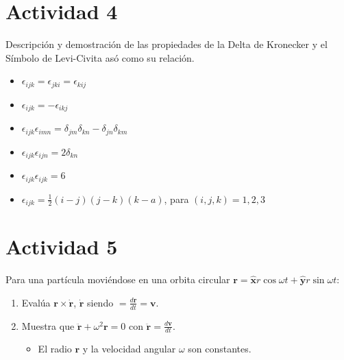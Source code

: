 \documentclass{article}
\begin{document}
\section{Actividad 4}
Descripción y demostración de las propiedades de la Delta de Kronecker y el Símbolo de Levi-Civita asó como su relación.
\begin{itemize}
    \item $\epsilon_{ijk}=\epsilon_{jki}=\epsilon_{kij}$
    \item $\epsilon_{ijk}=-\epsilon_{ikj}$
    \item $\epsilon_{ijk}\epsilon_{imn}=\delta_{jm}\delta_{kn}-\delta_{jn}\delta_{km}$
    \item $\epsilon_{ijk}\epsilon_{ijn}=2\delta_{kn}$
    \item $\epsilon_{ijk}\epsilon_{ijk}=6$
    \item $\epsilon_{ijk}=\frac{1}{2}(i-j)(j-k)(k-a)$, para $(i,j,k)=1,2,3$
\end{itemize}
\newpage
\section{Actividad 5}
Para una partícula moviéndose en una orbita circular $\pmb{r} = \pmb{\hat{x}}r\cos\omega t + \pmb{\hat{y}}r\sin\omega t$:
\begin{enumerate}
  \item Evalúa $\pmb{r}\times \pmb{\dot{r}}$, $\pmb{\dot{r}}$ siendo $= \frac{d\pmb{r}}{dt}=\pmb{v}$.
  \item Muestra que $\pmb{\ddot{r}}+\omega^2 \pmb{r}=0$ con $\pmb{\ddot{r}}=\frac{d\pmb{v}}{dt}$. 
  \begin{itemize}
    \item El radio $\pmb{r}$ y la velocidad angular $\omega$ son constantes.
  \end{itemize}
\end{enumerate}
\end{document}
